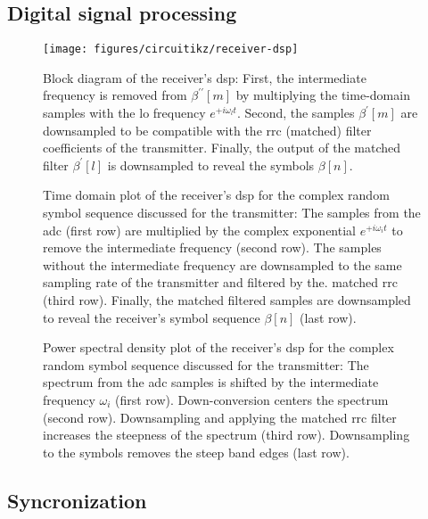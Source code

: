 \FloatBarrier
\subsection{Digital signal processing}


\begin{figure}[htb]
	\centering
	\texttt{[image: figures/circuitikz/receiver-dsp]}
	\caption{Block diagram of the receiver's \gls{dsp}: First, the intermediate frequency is removed from $\beta^{\prime\prime}[m]$ by multiplying the time-domain samples with the \gls{lo} frequency $e^{+i\omega_lt}$. Second, the samples $\beta^\prime[m]$ are downsampled to be compatible with the \gls{rrc} (matched) filter coefficients of the transmitter. Finally, the output of the matched filter $\beta^\prime[l]$ is downsampled to reveal the symbols $\beta[n]$.}
\end{figure}

\begin{figure}[htb]
	\centering
	
	\caption{Time domain plot of the receiver's \gls{dsp} for the complex random symbol sequence discussed for the transmitter: The samples from the \gls{adc} (first row) are multiplied by the complex exponential $e^{+i\omega_it}$ to remove the intermediate frequency (second row). The samples without the intermediate frequency are downsampled to the same sampling rate of the transmitter and filtered by the. matched \gls{rrc} (third row). Finally, the matched filtered samples are downsampled to reveal the receiver's symbol sequence $\beta[n]$ (last row).}
\end{figure}

\begin{figure}[htb]
	\centering
	
	\caption{Power spectral density plot of the receiver's \gls{dsp} for the complex random symbol sequence discussed for the transmitter: The spectrum from the \gls{adc} samples is shifted by the intermediate frequency $\omega_i$ (first row). Down-conversion centers the spectrum (second row). Downsampling and applying the matched \gls{rrc} filter increases the steepness of the spectrum (third row). Downsampling to the symbols removes the steep band edges (last row).}
\end{figure}

\FloatBarrier
\subsection{Syncronization}

